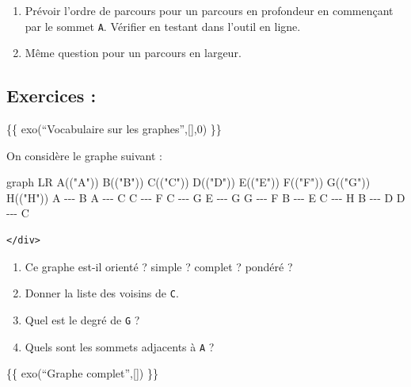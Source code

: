 \documentclass[
  letterpaper,
  DIV=11,
  numbers=noendperiod]{scrartcl}
\newenvironment{Shaded}{\begin{snugshade}}{\end{snugshade}}
\newcommand{\NormalTok}[1]{\textcolor[rgb]{0.00,0.23,0.31}{#1}}
\providecommand{\tightlist}{%
  \setlength{\itemsep}{0pt}\setlength{\parskip}{0pt}}\usepackage{longtable,booktabs,array}
\begin{document}
\begin{enumerate}
  \begin{enumerate}
  \def\labelenumii{\alph{enumii}.}
  \item
    Prévoir l'ordre de parcours pour un parcours en profondeur en
    commençant par le sommet \texttt{A}. Vérifier en testant dans
    l'outil en ligne.
  \item
    Même question pour un parcours en largeur.
  \end{enumerate}
\end{enumerate}

\hypertarget{exercices}{%
\subsection{Exercices :}\label{exercices}}

\{\{ exo(``Vocabulaire sur les graphes'',{[}{]},0) \}\}

On considère le graphe suivant :

\begin{Shaded}
\begin{Highlighting}[]
\NormalTok{graph LR}
\NormalTok{A(("A"))}
\NormalTok{B(("B"))}
\NormalTok{C(("C"))}
\NormalTok{D(("D"))}
\NormalTok{E(("E"))}
\NormalTok{F(("F"))}
\NormalTok{G(("G"))}
\NormalTok{H(("H"))}
\NormalTok{A {-}{-}{-} B}
\NormalTok{A {-}{-}{-} C}
\NormalTok{C {-}{-}{-} F}
\NormalTok{C {-}{-}{-} G}
\NormalTok{E {-}{-}{-} G}
\NormalTok{G {-}{-}{-} F}
\NormalTok{B {-}{-}{-} E}
\NormalTok{C {-}{-}{-} H}
\NormalTok{B {-}{-}{-} D}
\NormalTok{D {-}{-}{-} C}
\end{Highlighting}
\end{Shaded}

\begin{verbatim}
</div>
\end{verbatim}

\begin{enumerate}
\def\labelenumi{\arabic{enumi}.}
\tightlist
\item
  Ce graphe est-il orienté ? simple ? complet ? pondéré ?\\
\item
  Donner la liste des voisins de \texttt{C}.\\
\item
  Quel est le degré de \texttt{G} ?\\
\item
  Quels sont les sommets adjacents à \texttt{A} ?
\end{enumerate}

\{\{ exo(``Graphe complet'',{[}{]}) \}\}
\end{document}
